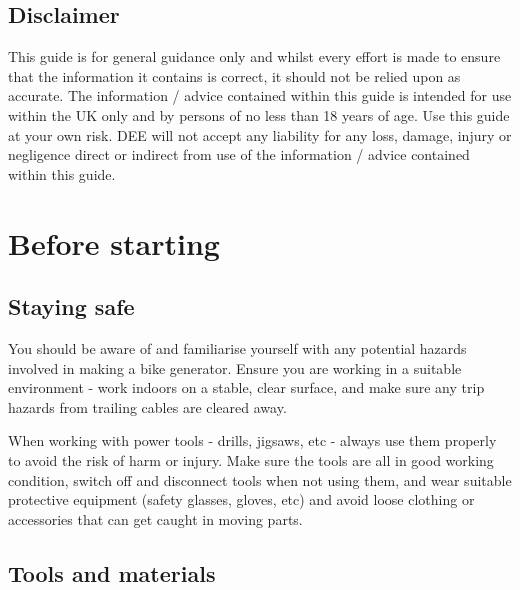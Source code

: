 \documentclass{article}
\theoremstyle{definition}
\theoremstyle{definition}
\theoremstyle{remark}
\begin{document}

  \subsection{Disclaimer} %
  \label{sub:disclaimer}

    This guide is for general guidance only and whilst every effort is made to ensure that the information it contains is correct, it should not be relied upon as accurate. The information / advice contained within this guide is intended for use within the UK only and by persons of no less than 18 years of age. Use this guide at your own risk. DEE will not accept any liability for any loss, damage, injury or negligence direct or indirect from use of the information / advice contained within this guide.


  \newpage  


\section{Before starting} %
\label{sec:before_starting}

  \subsection{Staying safe} %
  \label{sub:staying_safe}

    You should be aware of and familiarise yourself with any potential hazards involved in making a bike generator. Ensure you are working in a suitable environment - work indoors on a stable, clear surface, and make sure any trip hazards from trailing cables are cleared away. 

    When working with power tools - drills, jigsaws, etc - always use them properly to avoid the risk of harm or injury. Make sure the tools are all in good working condition, switch off and disconnect tools when not using them, and wear suitable protective equipment (safety glasses, gloves, etc) and avoid loose clothing or accessories that can get caught in moving parts.


  \subsection{Tools and materials} %
  \label{sub:tools_and_materials}
\end{document}
